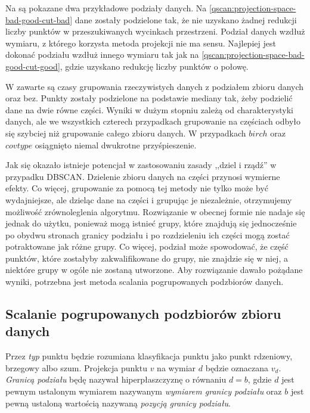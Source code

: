 Na  są pokazane dwa przykładowe podziały danych. Na \ref{qscan:projection-space-bad-good-cut-bad} dane zostały podzielone tak, że nie uzyskano żadnej redukcji liczby punktów w przeszukiwanych wycinkach przestrzeni. Podział danych wzdłuż wymiaru, z którego korzysta metoda projekcji nie ma sensu. Najlepiej jest dokonać podziału wzdłuż innego wymiaru tak jak na \ref{qscan:projection-space-bad-good-cut-good}, gdzie uzyskano redukcję liczby punktów o połowę.\par

W  zawarte są czasy grupowania rzeczywistych danych z podziałem zbioru danych oraz bez. Punkty zostały podzielone na podstawie mediany tak, żeby podzielić dane na dwie równe części. Wyniki w dużym stopniu zależą od charakterystyki danych, ale we wszystkich czterech przypadkach grupowanie na częściach odbyło się szybciej niż grupowanie całego zbioru danych. W przypadkach $ birch $ oraz $ covtype $ osiągnięto niemal dwukrotne przyśpieszenie.\par
Jak się okazało istnieje potencjał w zastosowaniu zasady ,,dziel i rządź'' w przypadku DBSCAN. Dzielenie zbioru danych na części przynosi wymierne efekty. Co więcej, grupowanie za pomocą tej metody nie tylko może być wydajniejsze, ale dzieląc dane na części i grupując je niezależnie, otrzymujemy możliwość zrównoleglenia algorytmu. Rozwiązanie w obecnej formie nie nadaje się jednak do użytku, ponieważ mogą istnieć grupy, które znajdują się jednocześnie po obydwu stronach granicy podziału i po rozdzieleniu ich części mogą zostać potraktowane jak różne grupy. Co więcej, podział może spowodować, że  część punktów, które zostałyby zakwalifikowane do grupy, nie znajdzie się w niej, a niektóre grupy w ogóle nie zostaną utworzone. Aby rozwiązanie dawało pożądane wyniki, potrzebna jest metoda scalania pogrupowanych podzbiorów danych.

\subsection{Scalanie pogrupowanych podzbiorów zbioru danych}
Przez \textit{typ} punktu będzie rozumiana klasyfikacja punktu jako punkt rdzeniowy, brzegowy albo szum. Projekcja punktu $ v $ na wymiar $ d $ będzie oznaczana $ v_d $. \textit{Granicą podziału} będę nazywał hiperpłaszczyznę o równaniu $ d=b $, gdzie $ d $ jest pewnym ustalonym wymiarem nazywanym \textit{wymiarem granicy podziału} oraz $ b $ jest pewną ustaloną wartością nazywaną \textit{pozycją granicy podziału}.

